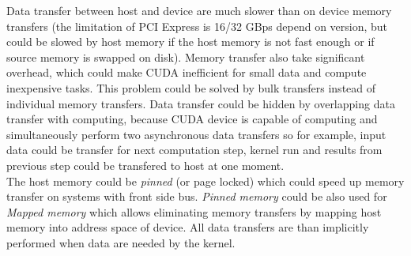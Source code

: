 Data transfer between host and device are much slower than on device memory transfers (the limitation of PCI Express is 16/32 GBps depend on version, but could be slowed by host memory if the host memory is not fast enough or if source memory is swapped on disk). Memory transfer also take significant overhead, which could make CUDA inefficient for small data and compute inexpensive tasks. This problem could be solved by bulk transfers instead of individual memory transfers. Data transfer could be hidden by overlapping data transfer with computing, because CUDA device is capable of computing and simultaneously perform two asynchronous data transfers so for example, input data could be transfer for next computation step, kernel run and results from previous step could be transfered to host at one moment.\\
The host memory could be \textit{pinned} (or page locked) which could speed up memory transfer on systems with front side bus. \textit{Pinned memory} could be also used for \textit{Mapped memory} which allows eliminating memory transfers by mapping host memory into address space of device. All data transfers are than implicitly performed when data are needed by the kernel.

